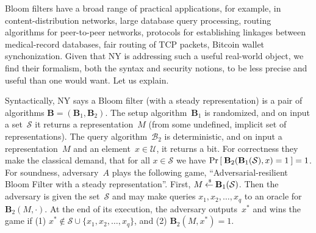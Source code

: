 Bloom filters have a broad range of practical applications, for
example, in content-distribution networks, large database query
processing, routing algorithms for peer-to-peer networks, protocols
for establishing linkages between medical-record databases, fair
routing of TCP packets, Bitcoin wallet synchonization.   Given that NY is addressing such a useful real-world
object, we find their formalism, both the syntax and security
notions, to be less precise and useful than one would want.  Let us
explain.

Syntactically, NY says a Bloom filter (with a steady representation)
is a pair of algorithms $\mathbf{B}=(\mathbf{B}_1, \mathbf{B}_2)$.
The setup algorithm~$\mathbf{B}_1$ is randomized, and on input a
set~$\mathcal{S}$ it returns a representation~$M$ (from some
undefined, implicit set of representations).  The query
algorithm~$\mathcal{B}_2$ is deterministic, and on input a
representation~$M$ and an element~$x \in \mathcal{U}$, it returns a
bit.  For correctness they make the classical demand, that for all
$x \in \mathcal{S}$ we have
$\Pr\left[\: \mathbf{B}_2(\mathbf{B}_1(\mathcal{S}),x)=1 \:\right]=1$.  For
soundness, adversary~$A$ plays the following game,
``Adversarial-resilient Bloom Filter with a steady representation''.
First, $M {\:\stackrel{{\scriptscriptstyle \hspace{0.2em}\$}} {\leftarrow}\:} \mathbf{B}_1(\mathcal{S})$. 
Then the
adversary is given the set~$\mathcal{S}$ and may make queries
$x_1,x_2,\ldots,x_q$ to an oracle for $\mathbf{B}_2(M,\cdot)$.  At
the end of its execution, the adversary outputs~$x^*$ and wins the
game if (1) $x^* \not\in \mathcal{S} \cup \{x_1,x_2,\ldots,x_q\}$,
and (2) $\mathbf{B}_2(M,x^*)=1$.

